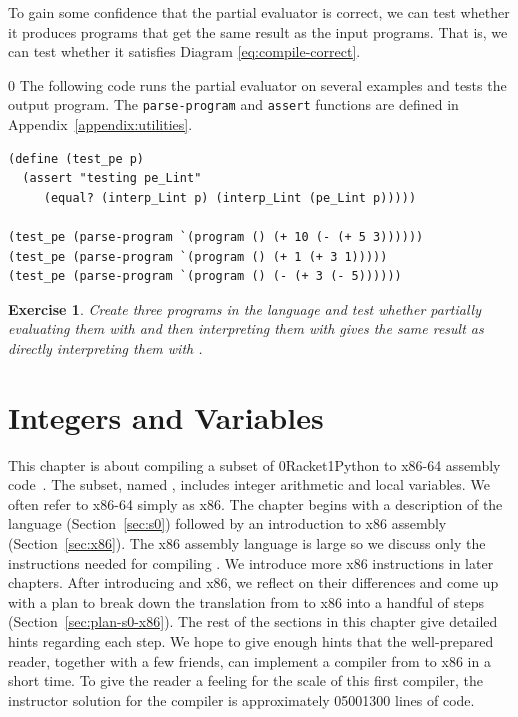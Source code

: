 \documentclass[7x10]{TimesAPriori_MIT}%
\def\racketEd{0}
\def\pythonEd{1}
\def\edition{1}
\newcommand{\racket}[1]{{\if\edition\racketEd{#1}\fi}}
\newcommand{\python}[1]{{\if\edition\pythonEd #1\fi}}
\newtheorem{exercise}[theorem]{Exercise}
\begin{document}
To gain some confidence that the partial evaluator is correct, we can
test whether it produces programs that get the same result as the
input programs. That is, we can test whether it satisfies Diagram
\ref{eq:compile-correct}.
%
{\if\edition\racketEd
The following code runs the partial evaluator on several examples and
tests the output program.  The \texttt{parse-program} and
\texttt{assert} functions are defined in
Appendix~\ref{appendix:utilities}.\\
\begin{minipage}{1.0\textwidth}
\begin{lstlisting}
(define (test_pe p)
  (assert "testing pe_Lint"
     (equal? (interp_Lint p) (interp_Lint (pe_Lint p)))))

(test_pe (parse-program `(program () (+ 10 (- (+ 5 3))))))
(test_pe (parse-program `(program () (+ 1 (+ 3 1)))))
(test_pe (parse-program `(program () (- (+ 3 (- 5))))))
\end{lstlisting}
\end{minipage}
\fi}

\begin{exercise}\normalfont
  Create three programs in the \LangInt{} language and test whether
  partially evaluating them with  and then
  interpreting them with  gives the same result
  as directly interpreting them with .
\end{exercise}


\chapter{Integers and Variables}
\label{ch:Lvar}

This chapter is about compiling a subset of
\racket{Racket}\python{Python} to x86-64 assembly
code~\citep{Intel:2015aa}. The subset, named \LangVar{}, includes
integer arithmetic and local variables.  We often refer to x86-64
simply as x86.  The chapter begins with a description of the
\LangVar{} language (Section~\ref{sec:s0}) followed by an introduction
to x86 assembly (Section~\ref{sec:x86}). The x86 assembly language is
large so we discuss only the instructions needed for compiling
\LangVar{}. We introduce more x86 instructions in later chapters.
After introducing \LangVar{} and x86, we reflect on their differences
and come up with a plan to break down the translation from \LangVar{}
to x86 into a handful of steps (Section~\ref{sec:plan-s0-x86}).  The
rest of the sections in this chapter give detailed hints regarding
each step.  We hope to give enough hints that the well-prepared
reader, together with a few friends, can implement a compiler from
\LangVar{} to x86 in a short time.  To give the reader a feeling for
the scale of this first compiler, the instructor solution for the
\LangVar{} compiler is approximately \racket{500}\python{300} lines of
code.
\end{document}
